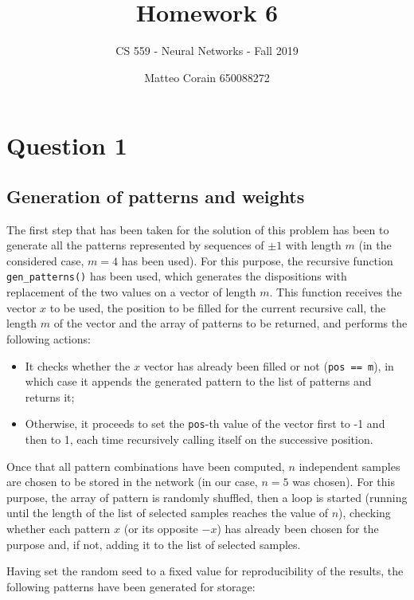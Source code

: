 \documentclass[letterpaper,headings=standardclasses]{scrartcl}
\title{Homework 6}
\subtitle{CS 559 - Neural Networks - Fall 2019}
\author{Matteo Corain 650088272}
\begin{document}
\maketitle

\section{Question 1}

\subsection{Generation of patterns and weights}

The first step that has been taken for the solution of this problem has been to generate all the patterns represented by sequences of $\pm 1$ with length $m$ (in the considered case, $m = 4$ has been used). For this purpose, the recursive function \texttt{gen\_patterns()} has been used, which generates the dispositions with replacement of the two values on a vector of length $m$. This function receives the vector $x$ to be used, the position to be filled for the current recursive call, the length $m$ of the vector and the array of patterns to be returned, and performs the following actions:

\begin{itemize}
    \item It checks whether the $x$ vector has already been filled or not (\texttt{pos == m}), in which case it appends the generated pattern to the list of patterns and returns it;
    \item Otherwise, it proceeds to set the \texttt{pos}-th value of the vector first to -1 and then to 1, each time recursively calling itself on the successive position.
\end{itemize}

Once that all pattern combinations have been computed, $n$ independent samples are chosen to be stored in the network (in our case, $n = 5$ was chosen). For this purpose, the array of pattern is randomly shuffled, then a loop is started (running until the length of the list of selected samples reaches the value of $n$), checking whether each pattern $x$ (or its opposite $-x$) has already been chosen for the purpose and, if not, adding it to the list of selected samples.

Having set the random seed to a fixed value for reproducibility of the results, the following patterns have been generated for storage:
\end{document}
